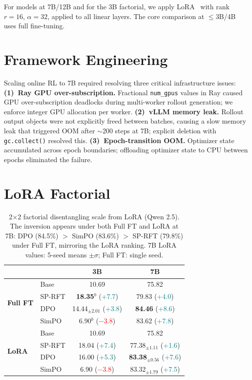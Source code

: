 \documentclass{article}
\newcommand{\sprft}{SP-RFT}
\begin{document}
For models at 7B/12B and for the 3B factorial, we apply LoRA~\citep{hu2022lora} with rank $r=16$, $\alpha=32$, applied to all linear layers. The core comparison at $\leq$3B/4B uses full fine-tuning.

\section{Framework Engineering}
\label{app:framework_eng}

Scaling online RL to 7B required resolving three critical infrastructure issues:
\textbf{(1)~Ray GPU over-subscription.} Fractional \texttt{num\_gpus} values in Ray caused GPU over-subscription deadlocks during multi-worker rollout generation; we enforce integer GPU allocation per worker.
\textbf{(2)~vLLM memory leak.} Rollout output objects were not explicitly freed between batches, causing a slow memory leak that triggered OOM after ${\sim}$200 steps at 7B; explicit deletion with \texttt{gc.collect()} resolved this.
\textbf{(3)~Epoch-transition OOM.} Optimizer state accumulated across epoch boundaries; offloading optimizer state to CPU between epochs eliminated the failure.

\section{LoRA Factorial}
\label{app:lora_factorial}

\begin{table}[ht]
\centering
\caption{2$\times$2 factorial disentangling scale from LoRA (Qwen 2.5). The inversion appears under both Full FT and LoRA at 7B: DPO (84.5\%) $>$ SimPO (83.6\%) $>$ \sprft{} (79.8\%) under Full FT, mirroring the LoRA ranking. 7B LoRA values: 5-seed means $\pm \sigma$; Full FT: single seed.}
\label{tab:lora_2x2}
\small
\begin{tabular}{@{}llcc@{}}
\toprule
& & \textbf{3B} & \textbf{7B} \\
\midrule
\multirow{4}{*}{\textbf{Full FT}} & Base & 10.69 & 75.82 \\
& \sprft{} & \textbf{18.35}$^b$ \small{(\textcolor{teal}{+7.7})} & 79.83 \small{(\textcolor{teal}{+4.0})} \\
& DPO & 14.44$_{\pm 2.01}$ \small{(\textcolor{teal}{+3.8})} & \textbf{84.46} \small{(\textcolor{teal}{+8.6})} \\
& SimPO & 6.90$^b$ \small{(\textcolor{red}{$-$3.8})} & 83.62 \small{(\textcolor{teal}{+7.8})} \\
\midrule
\multirow{4}{*}{\textbf{LoRA}} & Base & 10.69 & 75.82 \\
& \sprft{} & 18.04 \small{(\textcolor{teal}{+7.4})} & 77.38$_{\pm 1.11}$ \small{(\textcolor{teal}{+1.6})} \\
& DPO & 16.00 \small{(\textcolor{teal}{+5.3})} & \textbf{83.38}$_{\pm 0.56}$ \small{(\textcolor{teal}{+7.6})} \\
& SimPO & 6.90 \small{(\textcolor{red}{$-$3.8})} & 83.32$_{\pm 1.79}$ \small{(\textcolor{teal}{+7.5})} \\
\bottomrule
\end{tabular}
\end{table}
\end{document}
